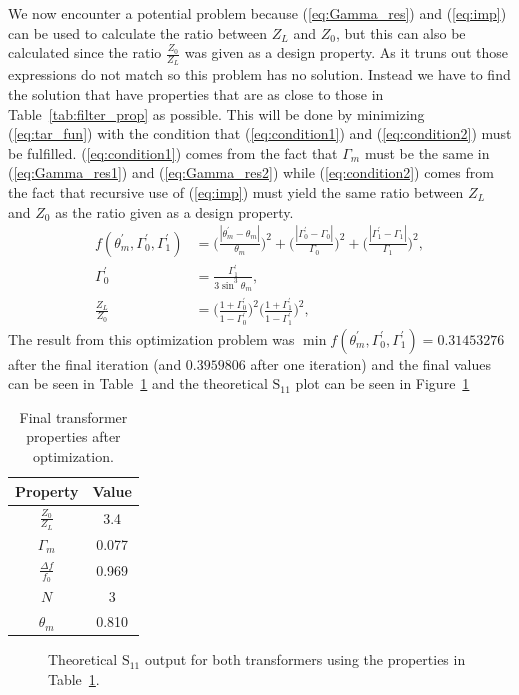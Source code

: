 \documentclass[12pt,a4paper]{article}
\begin{document}
We now encounter a potential problem because (\ref{eq:Gamma_res}) and (\ref{eq:imp}) can be used to calculate the ratio between $Z_{L}$ and $Z_{0}$, but this can also be calculated since the ratio $\frac{Z_{0}}{Z_{L}}$ was given as a design property. As it truns out those expressions do not match so this problem has no solution. Instead we have to find the solution that have properties that are as close to those in Table~\ref{tab:filter_prop} as possible. This will be done by minimizing (\ref{eq:tar_fun}) with the condition that (\ref{eq:condition1}) and (\ref{eq:condition2}) must be fulfilled. (\ref{eq:condition1}) comes from the fact that $\Gamma_{m}$ must be the same in (\ref{eq:Gamma_res1}) and (\ref{eq:Gamma_res2}) while (\ref{eq:condition2}) comes from the fact that recursive use of (\ref{eq:imp}) must yield the same ratio between $Z_{L}$ and $Z_{0}$ as the ratio given as a design property.
\begin{subequations}
  \begin{align}
    f(\theta^{'}_{m},\Gamma^{'}_{0}, \Gamma^{'}_{1})&=\Big(\frac{|\theta^{'}_{m}-\theta_{m}|}{\theta_{m}}\Big)^{2}+\Big(\frac{|\Gamma^{'}_{0}-\Gamma_{0}|}{\Gamma_{0}}\Big)^{2}+\Big(\frac{|\Gamma^{'}_{1}-\Gamma_{1}|}{\Gamma_{1}}\Big)^{2}, \label{eq:tar_fun} \\
    \Gamma^{'}_{0}&=\frac{\Gamma^{'}_{1}}{3\sin^3\theta_{m}}, \label{eq:condition1} \\
    \frac{Z_L}{Z_0}&=\Big(\frac{1+\Gamma^{'}_0}{1-\Gamma^{'}_0}\Big)^{2}\Big(\frac{1+\Gamma^{'}_1}{1-\Gamma^{'}_1}\Big)^{2}, \label{eq:condition2}
  \end{align}
  \label{eq:optimize}
\end{subequations}
The result from this optimization problem was $\min f(\theta^{'}_{m},\Gamma^{'}_{0}, \Gamma^{'}_{1})=0.31453276$ after the final iteration (and $0.3959806$ after one iteration) and the final values can be seen in Table~\ref{tab:final_val} and the theoretical $\text{S}_{11}$ plot can be seen in Figure~\ref{fig:theoretical}
\begin{table}
  \centering
  \caption{Final transformer properties after optimization.}
  \begin{tabular}{|c|c|}\hline
    Property & Value \\ \hline
    $\frac{Z_{0}}{Z_{L}}$ & 3.4 \\ \hline
    $\Gamma_{m}$ & 0.077 \\ \hline
    $\frac{\Delta f}{f_{0}}$ & 0.969 \\ \hline
    $N$ & 3 \\ \hline
    $\theta_{m}$ & 0.810 \\ \hline
  \end{tabular}
  \label{tab:final_val}
\end{table}
\begin{figure}
  \centering
  \noindent\makebox[\textwidth]{\scalebox{0.9}{}}
  \caption{Theoretical $\text{S}_{11}$ output for both transformers using the properties in Table~\ref{tab:final_val}.}
  \label{fig:theoretical}
\end{figure}
\end{document}
